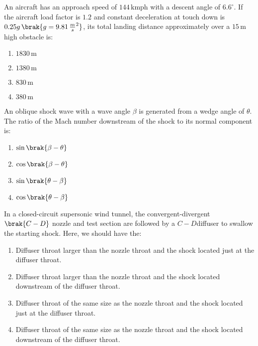     \item An aircraft has an approach speed of $144 \, \text{kmph}$ with a descent angle of $ 6.6^\circ $. If the aircraft load factor is $1.2$ and constant deceleration at touch down is $0.25g \, \brak{g = 9.81 \, \frac{m}{s}^2} $, its total landing distance approximately over a $15 \, \text{m}$ high obstacle is:
    \begin{enumerate}
        \item $1830 \, \text{m}$
        \item $1380 \, \text{m}$
        \item $830 \, \text{m}$
        \item $380 \, \text{m}$
    \end{enumerate}

    \item An oblique shock wave with a wave angle $ \beta $ is generated from a wedge angle of $ \theta $. The ratio of the Mach number downstream of the shock to its normal component is:
    \begin{enumerate}
        \item $ \sin\brak{\beta - \theta} $
        \item $ \cos\brak{\beta - \theta} $
        \item $ \sin\brak{\theta - \beta} $
        \item $ \cos\brak{\theta - \beta} $
    \end{enumerate}

    \item In a closed-circuit supersonic wind tunnel, the convergent-divergent $\brak{C-D}$ nozzle and test section are followed by a $C-D$diffuser to swallow the starting shock. Here, we should have the:
    \begin{enumerate}
        \item Diffuser throat larger than the nozzle throat and the shock located just at the diffuser throat.
        \item Diffuser throat larger than the nozzle throat and the shock located downstream of the diffuser throat.
        \item Diffuser throat of the same size as the nozzle throat and the shock located just at the diffuser throat.
        \item Diffuser throat of the same size as the nozzle throat and the shock located downstream of the diffuser throat.
    \end{enumerate}

